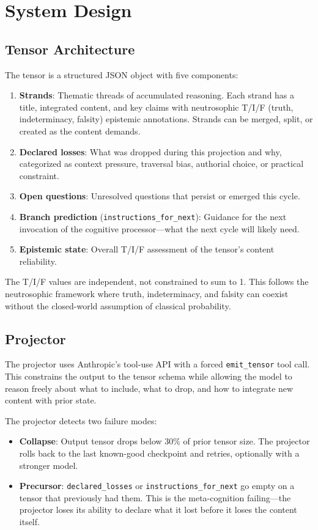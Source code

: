 \documentclass[11pt]{article}
\begin{document}
\section{System Design}

\subsection{Tensor Architecture}

The tensor is a structured JSON object with five components:

\begin{enumerate}
\item \textbf{Strands}: Thematic threads of accumulated reasoning. Each
  strand has a title, integrated content, and key claims with
  neutrosophic T/I/F (truth, indeterminacy, falsity) epistemic
  annotations. Strands can be merged, split, or created as the
  content demands.
\item \textbf{Declared losses}: What was dropped during this projection
  and why, categorized as context pressure, traversal bias, authorial
  choice, or practical constraint.
\item \textbf{Open questions}: Unresolved questions that persist or
  emerged this cycle.
\item \textbf{Branch prediction} (\texttt{instructions\_for\_next}):
  Guidance for the next invocation of the cognitive processor---what
  the next cycle will likely need.
\item \textbf{Epistemic state}: Overall T/I/F assessment of the
  tensor's content reliability.
\end{enumerate}

The T/I/F values are independent, not constrained to sum to 1. This
follows the neutrosophic framework where truth, indeterminacy, and
falsity can coexist without the closed-world assumption of classical
probability.

\subsection{Projector}

The projector uses Anthropic's tool-use API with a forced
\texttt{emit\_tensor} tool call. This constrains the output to the
tensor schema while allowing the model to reason freely about what to
include, what to drop, and how to integrate new content with prior
state.

The projector detects two failure modes:
\begin{itemize}
\item \textbf{Collapse}: Output tensor drops below 30\% of prior
  tensor size. The projector rolls back to the last known-good
  checkpoint and retries, optionally with a stronger model.
\item \textbf{Precursor}: \texttt{declared\_losses} or
  \texttt{instructions\_for\_next} go empty on a tensor that
  previously had them. This is the meta-cognition failing---the
  projector loses its ability to declare what it lost before it
  loses the content itself.
\end{itemize}
\end{document}
